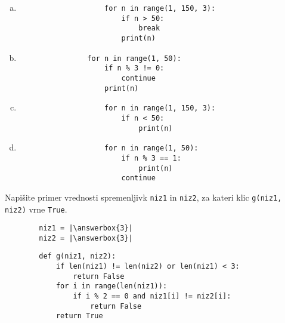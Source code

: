 \documentclass[arhiv, 10pt]{../izpit}
\newcommand{\inlinepy}[1]{\texttt{#1}}
\newcommand{\answerbox}[1]{\framebox{\vphantom{\large M}\hspace{#1cm}}}
\begin{document}
        \begin{multicols}{2}
        \begin{enumerate}[(a)]
\item 
                \begin{verbatim}
                    for n in range(1, 150, 3):
                        if n > 50:
                            break
                        print(n)
                \end{verbatim}
            
\item 
            \begin{verbatim}
                for n in range(1, 50):
                    if n % 3 != 0:
                        continue
                    print(n)
            \end{verbatim}
        
\item 
                \begin{verbatim}
                    for n in range(1, 150, 3):
                        if n < 50:
                            print(n)
                \end{verbatim}
            
\item 
                \begin{verbatim}
                    for n in range(1, 50):
                        if n % 3 == 1:
                            print(n)
                        continue
                \end{verbatim}
            
\end{enumerate}

        \end{multicols}
    
        \naloga*
        \begin{multicols}{2}
        \noindent
        Napišite primer vrednosti spremenljivk \inlinepy{niz1} in \inlinepy{niz2}, za kateri klic \inlinepy{g(niz1, niz2)} vrne \inlinepy{True}.
        \begin{verbatim}
        niz1 = |\answerbox{3}|
        niz2 = |\answerbox{3}|
        \end{verbatim}
        \vfil
        \columnbreak
        \begin{verbatim}
        def g(niz1, niz2):
            if len(niz1) != len(niz2) or len(niz1) < 3:
                return False
            for i in range(len(niz1)):
                if i % 2 == 0 and niz1[i] != niz2[i]:
                    return False
            return True
        \end{verbatim}
        \end{multicols}
    
\end{document}
